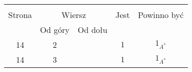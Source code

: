 \documentclass[a4paper,11pt]{article}
\begin{document}
\begin{center}
  \begin{tabular}{|c|c|c|c|c|}
    \hline
    & \multicolumn{2}{c|}{} & & \\
    Strona & \multicolumn{2}{c|}{Wiersz} & Jest
                              & Powinno być \\ \cline{2-3}
    & Od góry & Od dołu & & \\
    \hline
    14  &  2 & & $1$ & $1_{ A^{ * } }$ \\
    14  &  3 & & $1$ & $1_{ A^{ * } }$ \\

\end{tabular}
\end{center}
\end{document}
